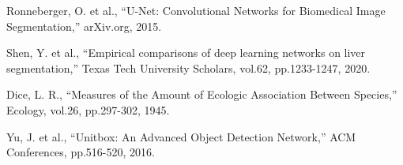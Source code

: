 \documentclass[a4paper]{article}
\begin{document}
\begin{thebibliography}{99}
	Ronneberger, O. et al., “U-Net: Convolutional Networks for Biomedical Image Segmentation,” arXiv.org, 2015.

	Shen, Y. et al., “Empirical comparisons of deep learning networks on liver segmentation,” Texas Tech University Scholars, vol.62, pp.1233-1247, 2020. 

	Dice, L. R., “Measures of the Amount of Ecologic Association Between Species,” Ecology, vol.26, pp.297-302, 1945.

	Yu, J. et al., “Unitbox: An Advanced Object Detection Network,” ACM Conferences, pp.516-520, 2016.


\end{thebibliography}

\normalsize
\end{document}
